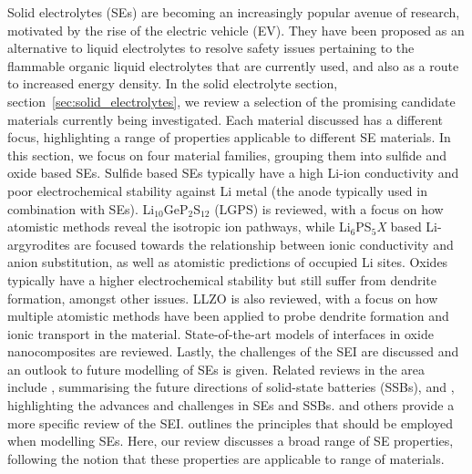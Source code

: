 \documentclass[../main.tex]{subfiles}
\begin{document}
Solid electrolytes (SEs) are becoming an increasingly popular avenue of research, motivated by the rise of the electric vehicle (EV). \cite{Woods_2021} They have been proposed as an alternative to liquid electrolytes to resolve safety issues pertaining to the flammable organic liquid electrolytes that are currently used,\cite{Shepherd_Siddiqui, Pfrang2017} and also as a route to increased energy density\cite{Liu2019_e_den}. In the solid electrolyte section, section~\ref{sec:solid_electrolytes}, we review a selection of the promising candidate materials currently being investigated. Each material discussed has a different focus, highlighting a range of properties applicable to different SE materials. In this section, we focus on four material families, grouping them into sulfide and oxide based SEs. Sulfide based SEs typically have a high Li-ion conductivity and poor electrochemical stability against Li metal (the anode typically used in combination with SEs). \cite{Zhu2015, Zhang2019se_rev} Li$_{10}$GeP$_2$S$_{12}$ (LGPS) is reviewed, with a focus on how atomistic methods reveal the isotropic ion pathways, while Li$_6$PS$_5$\textit{X} based Li-argyrodites are focused towards the relationship between ionic conductivity and anion substitution, as well as atomistic predictions of occupied Li sites. Oxides typically have a higher electrochemical stability but still suffer from dendrite formation, amongst other issues.\cite{Zhu2015} LLZO is also reviewed, with a focus on how multiple atomistic methods have been applied to probe dendrite formation and ionic transport in the material. State-of-the-art models of interfaces in oxide nanocomposites are reviewed. Lastly, the challenges of the SEI are discussed and an outlook to future modelling of SEs is given. Related reviews in the area include \citeauthor{Zhang2018se_review}, \cite{Zhang2018se_review} summarising the future directions of solid-state batteries (SSBs), and \citeauthor{Gurung2019}, \cite{Gurung2019} highlighting the advances and challenges in SEs and SSBs. \citeauthor{Xiao2020interfacerev}\cite{Xiao2020interfacerev} and others\cite{Xu2018exp,Tateyama2019} provide a more specific review of the SEI. \citeauthor{Ceder2018} \cite{Ceder2018} outlines the principles that should be employed when modelling SEs. Here, our review discusses a broad range of SE properties, following the notion that these properties are applicable to range of materials.
\end{document}
